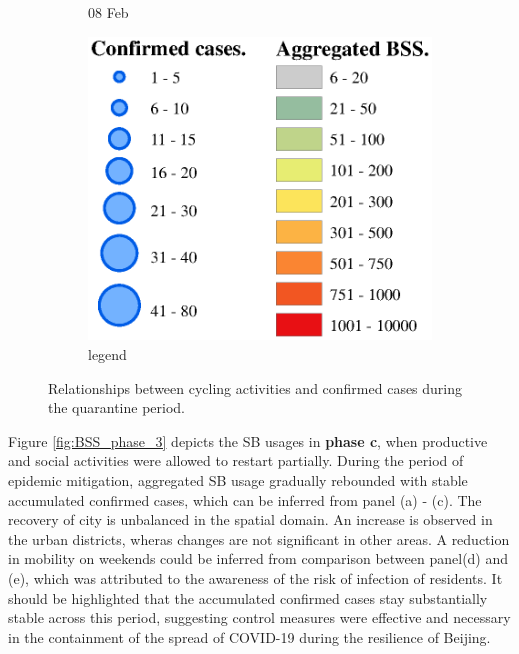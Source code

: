 \documentclass[preprints,ijgi,submit,moreauthors]{Definitions/mdpi}
\begin{document}
\begin{figure}[ht]
\begin{subfigure}{.3\textwidth}
        \caption{08 Feb}
    \end{subfigure}
    \begin{subfigure}{.3\textwidth}
        \includegraphics[width=\textwidth]{Figures/Relation_with_confrimed_cases/legend7.eps}
        \caption{legend}
    \end{subfigure}
    \caption{Relationships between cycling activities and confirmed cases during the quarantine period.}
    \label{fig:BSS_phase1_2}
\end{figure}

Figure \ref{fig:BSS_phase_3} depicts the SB usages in \textbf{phase c}, when productive and social activities were allowed to restart partially.
During the period of epidemic mitigation, aggregated SB usage gradually rebounded with stable accumulated confirmed cases, which can be inferred from panel (a) - (c).
The recovery of city is unbalanced in the spatial domain.
An increase is observed in the urban districts, wheras changes are not significant in other areas.
A reduction in mobility on weekends could be inferred from comparison between panel(d) and (e), which was attributed to the awareness of the risk of infection of residents.
It should be highlighted that the accumulated confirmed cases stay substantially stable across this period, suggesting control measures were effective and necessary in the containment of the spread of COVID-19 during the resilience of Beijing.
\end{document}
